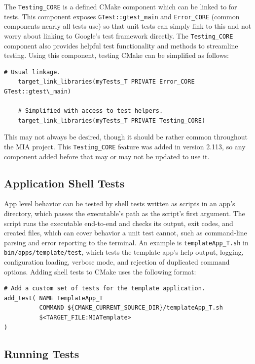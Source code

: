 The \texttt{Testing\_CORE} is a defined CMake component which can be linked to for tests. This component exposes \texttt{GTest::gtest\_main} and \texttt{Error\_CORE} (common components nearly all tests use) so that unit tests can simply link to this and not worry about linking to Google's test framework directly. The \texttt{Testing\_CORE} component also provides helpful test functionality and methods to streamline testing. Using this component, testing CMake can be simplified as follows:
\begin{lstlisting}[style=makestyle]
	# Usual linkage.
	target_link_libraries(myTests_T PRIVATE Error_CORE GTest::gtest\_main)

	# Simplified with access to test helpers.
	target_link_libraries(myTests_T PRIVATE Testing_CORE)
\end{lstlisting}
This may not always be desired, though it should be rather common throughout the MIA project. This \texttt{Testing\_CORE} feature was added in version 2.113, so any component added before that may or may not be updated to use it.

\subsection{Application Shell Tests}\label{section:testing_shell_scripts}

App level behavior can be tested by shell tests written as  scripts in an app's  directory, which passes the executable's path as the script's first argument. The script runs the executable end-to-end and checks its output, exit codes, and created files, which can cover behavior a unit test cannot, such as command-line parsing and error reporting to the terminal. An example is \texttt{templateApp\_T.sh} in \texttt{bin/apps/template/test}, which tests the template app's help output, logging, configuration loading, verbose mode, and rejection of duplicated command options. Adding shell tests to CMake uses the following format:
\begin{lstlisting}[style=makestyle]
# Add a custom set of tests for the template application.
add_test( NAME TemplateApp_T
          COMMAND ${CMAKE_CURRENT_SOURCE_DIR}/templateApp_T.sh
          $<TARGET_FILE:MIATemplate>
)
\end{lstlisting}

\subsection{Running Tests}

